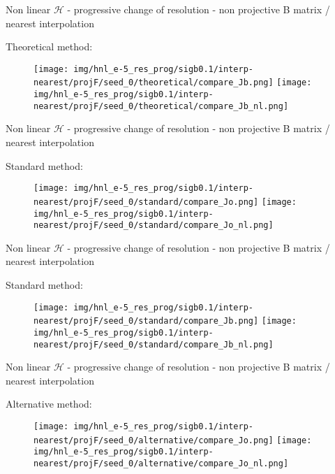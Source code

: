 \documentclass[francais]{beamer}
\begin{document}
\begin{frame}{Non linear $\mathcal{H}$ - progressive change of resolution - non projective B matrix / nearest interpolation}
\begin{center}
Theoretical method:
\begin{figure}
  \texttt{[image: img/hnl\_e-5\_res\_prog/sigb0.1/interp-nearest/projF/seed\_0/theoretical/compare\_Jb.png]}
\endminipage\hfill
{}
  \texttt{[image: img/hnl\_e-5\_res\_prog/sigb0.1/interp-nearest/projF/seed\_0/theoretical/compare\_Jb\_nl.png]}
\endminipage
\end{figure}
\end{center}
\end{frame}

\begin{frame}{Non linear $\mathcal{H}$ - progressive change of resolution - non projective B matrix / nearest interpolation}
\begin{center}
Standard method:
\begin{figure}
  \texttt{[image: img/hnl\_e-5\_res\_prog/sigb0.1/interp-nearest/projF/seed\_0/standard/compare\_Jo.png]}
\endminipage\hfill
{}
  \texttt{[image: img/hnl\_e-5\_res\_prog/sigb0.1/interp-nearest/projF/seed\_0/standard/compare\_Jo\_nl.png]}
\endminipage
\end{figure}
\end{center}
\end{frame}


\begin{frame}{Non linear $\mathcal{H}$ - progressive change of resolution - non projective B matrix / nearest interpolation}
\begin{center}
Standard method:
\begin{figure}
  \texttt{[image: img/hnl\_e-5\_res\_prog/sigb0.1/interp-nearest/projF/seed\_0/standard/compare\_Jb.png]}
\endminipage\hfill
{}
  \texttt{[image: img/hnl\_e-5\_res\_prog/sigb0.1/interp-nearest/projF/seed\_0/standard/compare\_Jb\_nl.png]}
\endminipage
\end{figure}
\end{center}
\end{frame}

\begin{frame}{Non linear $\mathcal{H}$ - progressive change of resolution - non projective B matrix / nearest interpolation}
\begin{center}
Alternative method:
\begin{figure}
  \texttt{[image: img/hnl\_e-5\_res\_prog/sigb0.1/interp-nearest/projF/seed\_0/alternative/compare\_Jo.png]}
\endminipage\hfill
{}
  \texttt{[image: img/hnl\_e-5\_res\_prog/sigb0.1/interp-nearest/projF/seed\_0/alternative/compare\_Jo\_nl.png]}
\endminipage
\end{figure}
\end{center}
\end{frame}
\end{document}
